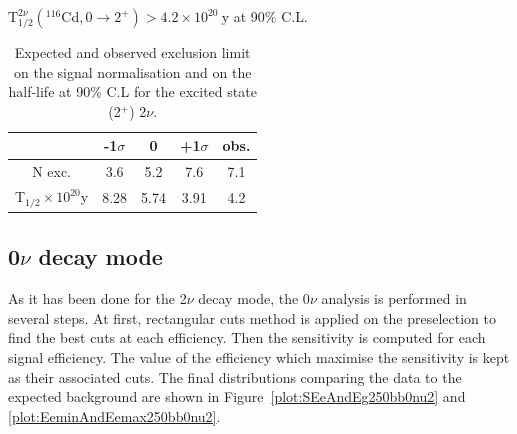 \documentclass[main.tex]{subfiles}
\begin{document}
\begin{center}
$ \text{T}_{\text{1/2}}^{\text{2}\nu} (^{\text{116}} \text{Cd}, \text{0} \rightarrow \text{2}^{+}) > \text{4.2} \times \text{10}^{\text{20}}~\text{y}$ at 90\% C.L.
\end{center}


\begin{table}
\centering
\begin{tabular}{c|c|c|c||c}
                                                & -1$\sigma$ & 0        & +1$\sigma$ & obs.     \\[0.2cm]
\hline
N exc.                                          & 3.6        & 5.2      & 7.6        & 7.1      \\[0.2cm]
T$_{\text{1/2}} \times \text{10}^{\text{20}}$y  & 8.28       & 5.74     & 3.91       & 4.2      \\[0.2cm]
\hline
\end{tabular}
\caption{Expected and observed exclusion limit on the signal normalisation and on the half-life at 90\% C.L for the excited state (2$^+$) 2$\nu$.}
\label{Tab:FinalResultsbb2nu2}
\end{table}


\FloatBarrier


\subsection{0$\nu$ decay mode}\label{sec:AnalysisResult2PLUS0nu}


\NI As it has been done for the 2$\nu$ decay mode, the 0$\nu$ analysis is performed in several steps. At first, rectangular cuts method is applied on the preselection to find the best cuts at each efficiency. Then the sensitivity is computed for each signal efficiency. The value of the efficiency which maximise the sensitivity is kept as their associated cuts. The final distributions comparing the data to the expected background are shown in Figure~\ref{plot:SEeAndEg250bb0nu2} and \ref{plot:EeminAndEemax250bb0nu2}.
\end{document}
